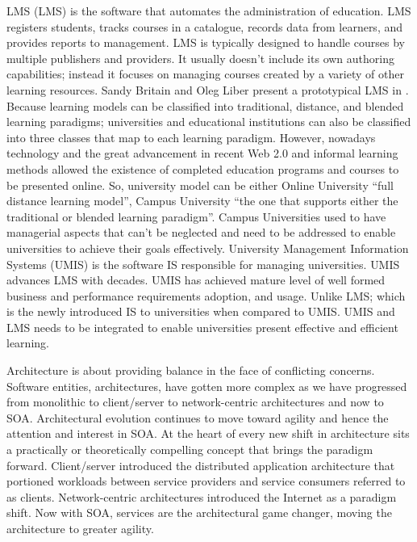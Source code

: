 \documentclass[12pt,a4paper,final,twoside,onecolumn,titlepage]{book}
\begin{document}
\gls{LMS} (\gls{LMS}) is the software that automates the administration of education. \gls{LMS} registers students, tracks courses in a catalogue, records data from learners, and provides reports to management. \gls{LMS} is typically designed to handle courses by multiple publishers and providers. It usually doesn’t include its own authoring capabilities; instead it focuses on managing courses created by a variety of other learning resources. Sandy Britain and Oleg Liber present a prototypical \gls{LMS} in \cite{EV01}. Because learning models can be classified into traditional, distance, and blended learning paradigms; universities and educational institutions can also be classified into three classes that map to each learning paradigm. However, nowadays technology and the great advancement in recent Web 2.0 and informal learning methods allowed the existence of completed education programs and courses to be presented online. So, university model can be either Online University “full distance learning model”, Campus University “the one that supports either the traditional or blended learning paradigm”. Campus Universities used to have managerial aspects that can’t be neglected and need to be addressed to enable universities to achieve their goals effectively. University Management Information Systems (\gls{UMIS}) is the software \gls{IS} responsible for managing universities. \gls{UMIS} advances \gls{LMS} with decades. \gls{UMIS} has achieved mature level of well formed business and performance requirements adoption, and usage. Unlike \gls{LMS}; which is the newly introduced \gls{IS} to universities when compared to \gls{UMIS}. \gls{UMIS} and \gls{LMS} needs to be integrated to enable universities present effective and efficient learning.

Architecture is about providing balance in the face of conflicting concerns. Software entities, architectures, have gotten more complex as we have progressed from monolithic to client/server to network-centric architectures and now to \gls{SOA}. Architectural evolution continues to move toward agility and hence the attention and interest in \gls{SOA}. At the heart of every new shift in architecture sits a practically or theoretically compelling concept that brings the paradigm forward. Client/server introduced the distributed application architecture that portioned workloads between service providers and service consumers referred to as clients. Network-centric architectures introduced the Internet as a paradigm shift. Now with \gls{SOA}, services are the architectural game changer, moving the architecture to greater agility.
\end{document}
